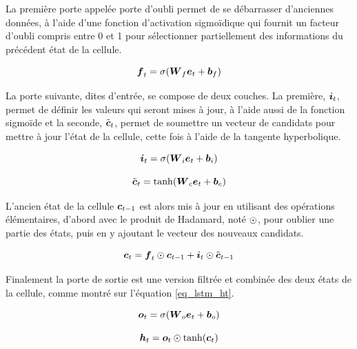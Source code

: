 \begin{appendices}
	La première porte appelée porte d'oubli permet de se débarrasser d'anciennes données, à l'aide d'une fonction d'activation sigmoïdique qui fournit un facteur d'oubli compris entre 0 et 1 pour sélectionner partiellement des informations du précédent état de la cellule.
	
	\begin{equation} \label{eq_lstm_ft_app}
		\vect{f}_t = \sigma(\matr{W}_f \vect{e}_t + \vect{b}_f)
	\end{equation}
	
	La porte suivante, dites d'entrée, se compose de deux couches. La première, $\vect{i}_t$, permet de définir les valeurs qui seront mises à jour, à l'aide aussi de la fonction sigmoïde et la seconde,  $\tilde{\vect{c}}_t$, permet de soumettre un vecteur de candidats pour mettre à jour l'état de la cellule, cette fois à l'aide de la tangente hyperbolique.
	
	\begin{equation} \label{eq_lstm_it}
		\vect{i}_t = \sigma(\matr{W}_i \vect{e}_t + \vect{b}_i)
	\end{equation}
	
	\begin{equation} \label{eq_lstm_ctt}
		\tilde{\vect{c}}_t = \tanh(\matr{W}_c \vect{e}_t + \vect{b}_c)
	\end{equation}
	
	L'ancien état de la cellule $\vect{c}_{t-1}$ est alors mis à jour en utilisant des opérations élémentaires, d'abord avec le produit de Hadamard, noté $\odot$, pour oublier une partie des états, puis en y ajoutant le vecteur des nouveaux candidats.
	
	\begin{equation} \label{eq_lstm_ct_app}
		\vect{c}_t = \vect{f}_t \hadamard \vect{c}_{t-1} + \vect{i}_t \hadamard \tilde{\vect{c}}_{t-1} 
	\end{equation}
	
	Finalement la porte de sortie est une version filtrée et combinée des deux états de la cellule, comme montré sur l'équation \cref{eq_lstm_ht}.
	
	\begin{equation} \label{eq_lstm_ot}
		\vect{o}_t =  \sigma(\matr{W}_o \vect{e}_t + \vect{b}_o)
	\end{equation}
	
	\begin{equation} \label{eq_lstm_ht}
		\vect{h}_t =  \vect{o}_t \hadamard \tanh(\vect{c}_t)
	\end{equation}
	

\end{appendices}
